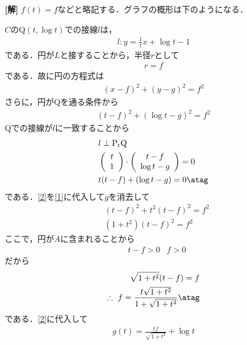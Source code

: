 \documentclass[a4j]{jarticle}
\begin{document}
\setlength{\columnseprule}{0.4pt}
\begin{multicols}{2}
{\bf[解]} $f(t)=f$などと略記する．グラフの概形は下のようになる．


$C$のQ$(t,\log t)$での接線$l$は，
     \begin{align*}
     l:y=\frac{1}{t}x+\log t-1
     \end{align*}
である．円が$L$と接することから，半径$r$として
     \begin{align}
     r=f
     \end{align}
である．故に円の方程式は
     \begin{align*}
     (x-f)^2+(y-g)^2=f^2
     \end{align*}
さらに，円がQを通る条件から
     \begin{align}
     (t-f)^2+(\log t-g)^2=f^2\label{1}
     \end{align}
Qでの接線が$l$に一致することから
     \begin{align*}
     &l \perp\mathrm{P_tQ} \\
     &\vtwo{t}{1}\cdot\vtwo{t-f}{\log t-g}=0 \\
     &t(t-f)+(\log t-g)=0\atag\label{2}
     \end{align*}
である．\eqref{2}を\eqref{1}に代入して$g$を消去して
     \begin{align*}
     &(t-f)^2+t^2(t-f)^2=f^2 \\
     &(1+t^2)(t-f)^2=f^2
     \end{align*}
ここで，円が$A$に含まれることから
     \begin{align*}
     &t-f>0&f>0
     \end{align*}
だから
     \begin{align*}
     \sqrt{1+t^2}(t-f)=f \\
     \therefore \,\, f=\frac{t\sqrt{1+t^2}}{1+\sqrt{1+t^2}}\atag\label{3}
     \end{align*}
である．\eqref{2}に代入して
     \begin{align}
     g(t)=\frac{tf}{\sqrt{1+t^2}}+\log t\label{4}
     \end{align}


\end{multicols}
\end{document}
